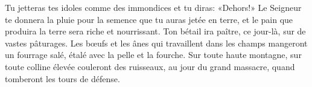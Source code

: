 Tu jetteras tes idoles comme des immondices et tu diras: «Dehors!»
Le Seigneur te donnera la pluie pour la semence que tu auras jetée en terre,
	et le pain que produira la terre sera riche et nourrissant.
	Ton bétail ira paître, ce jour-là, sur de vastes pâturages.
Les bœufs et les ânes qui travaillent dans les champs
	mangeront un fourrage salé, étalé avec la pelle et la fourche.
Sur toute haute montagne, sur toute colline élevée
	couleront des ruisseaux, au jour du grand massacre,
	quand tomberont les tours de défense.
